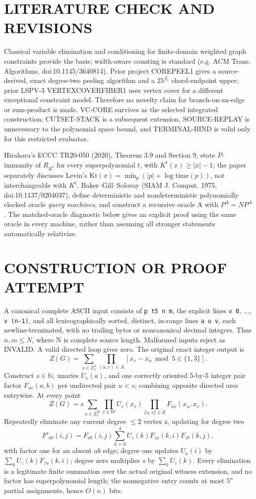 \documentclass[11pt]{article}
\begin{document}
\section{LITERATURE CHECK AND REVISIONS}
Classical variable elimination and conditioning for finite-domain weighted graph constraints provide the basis; width-aware counting is standard (e.g. ACM Trans. Algorithms, doi:10.1145/3640814). Prior project COREPEEL1 gives a source-derived, exact degree-two peeling algorithm and a $25^{\beta_*}$ chord-endpoint upper; prior LSPV-3 VERTEXCOVERFIBER1 uses vertex cover for a different exceptional constraint model. Therefore no novelty claim for branch-on-an-edge or sum-product is made. VC-CORE survives as the selected integrated construction; CUTSET-STACK is a subsequent extension, SOURCE-REPLAY is unnecessary to the polynomial space bound, and TERMINAL-BIND is valid only for this restricted evaluator.
\par Hirahara's ECCC TR20-050 (2020), Theorem 3.9 and Section 9, state $P$-immunity of $R_{K^t}$ for every superpolynomial $t$, with $K^t(x)\ge |x|-1$; the paper separately discusses Levin's $\mathrm{Kt}(x)=\min_p(|p|+\log \mathrm{time}(p))$, not interchangeable with $K^t$. Baker--Gill--Solovay (SIAM J. Comput. 1975, doi:10.1137/0204037), define deterministic and nondeterministic polynomially clocked oracle \emph{query machines}, and construct a recursive oracle A with $P^A=NP^A$. The matched-oracle diagnostic below gives an explicit proof using the same oracle in every machine, rather than assuming all stronger statements automatically relativize.

\section{CONSTRUCTION OR PROOF ATTEMPT}
A canonical complete ASCII input consists of \texttt{p t5 n m}, the explicit lines \texttt{v 0}, ..., \texttt{v (n-1)}, and all lexicographically sorted, distinct, in-range lines \texttt{a u v}, each newline-terminated, with no trailing bytes or noncanonical decimal integers. Thus $n,m\le N$, where N is complete source length. Malformed inputs reject as INVALID. A valid directed loop gives zero. The original exact integer output is
\[
Z(G)=\sum_{x\in\mathbb Z_5^n}\prod_{(u,v)\in A}[x_v-x_u\bmod5\in\{1,3\}].
\]
Construct $s\in\mathbb N$, unaries $U_v(a)$, and one correctly oriented $5$-by-$5$ integer pair factor $F_{uv}(a,b)$ per undirected pair $u<v$, combining opposite directed arcs entrywise. At every point
\[
Z(G)=s\sum_{x\in\mathbb Z_5^W}\prod_{v\in W}U_v(x_v)\prod_{\{u,v\}\in E}F_{uv}(x_u,x_v).
\tag{1}
\]
Repeatedly eliminate any current degree $\le2$ vertex z, updating for degree two
\[
F'_{ab}(i,j)=F_{ab}(i,j)\sum_{k=0}^4 U_z(k)F_{za}(k,i)F_{zb}(k,j),
\tag{2}
\]
with factor one for an absent $ab$ edge; degree one updates $U_a(i)$ by $\sum_k U_z(k)F_{za}(k,i)$; degree zero multiplies $s$ by $\sum_kU_z(k)$. Every elimination is a legitimate finite summation over the actual original witness extension, and no factor has superpolynomial length: the nonnegative entry counts at most $5^n$ partial assignments, hence $O(n)$ bits.
\end{document}
